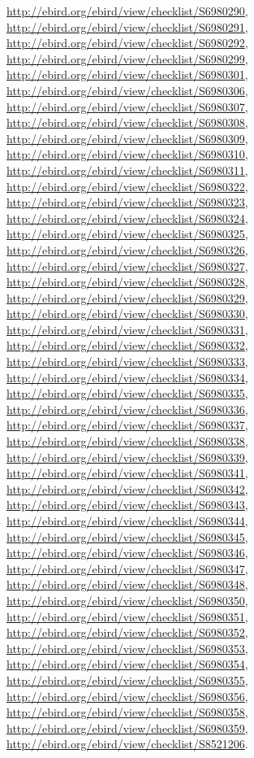 \documentclass[9pt, article]{memoir}
\begin{document}
\begin{multicols}{2}
\url{http://ebird.org/ebird/view/checklist/S6980290}, 
\url{http://ebird.org/ebird/view/checklist/S6980291}, 
\url{http://ebird.org/ebird/view/checklist/S6980292}, 
\url{http://ebird.org/ebird/view/checklist/S6980299}, 
\url{http://ebird.org/ebird/view/checklist/S6980301}, 
\url{http://ebird.org/ebird/view/checklist/S6980306}, 
\url{http://ebird.org/ebird/view/checklist/S6980307}, 
\url{http://ebird.org/ebird/view/checklist/S6980308}, 
\url{http://ebird.org/ebird/view/checklist/S6980309}, 
\url{http://ebird.org/ebird/view/checklist/S6980310}, 
\url{http://ebird.org/ebird/view/checklist/S6980311}, 
\url{http://ebird.org/ebird/view/checklist/S6980322}, 
\url{http://ebird.org/ebird/view/checklist/S6980323}, 
\url{http://ebird.org/ebird/view/checklist/S6980324}, 
\url{http://ebird.org/ebird/view/checklist/S6980325}, 
\url{http://ebird.org/ebird/view/checklist/S6980326}, 
\url{http://ebird.org/ebird/view/checklist/S6980327}, 
\url{http://ebird.org/ebird/view/checklist/S6980328}, 
\url{http://ebird.org/ebird/view/checklist/S6980329}, 
\url{http://ebird.org/ebird/view/checklist/S6980330}, 
\url{http://ebird.org/ebird/view/checklist/S6980331}, 
\url{http://ebird.org/ebird/view/checklist/S6980332}, 
\url{http://ebird.org/ebird/view/checklist/S6980333}, 
\url{http://ebird.org/ebird/view/checklist/S6980334}, 
\url{http://ebird.org/ebird/view/checklist/S6980335}, 
\url{http://ebird.org/ebird/view/checklist/S6980336}, 
\url{http://ebird.org/ebird/view/checklist/S6980337}, 
\url{http://ebird.org/ebird/view/checklist/S6980338}, 
\url{http://ebird.org/ebird/view/checklist/S6980339}, 
\url{http://ebird.org/ebird/view/checklist/S6980341}, 
\url{http://ebird.org/ebird/view/checklist/S6980342}, 
\url{http://ebird.org/ebird/view/checklist/S6980343}, 
\url{http://ebird.org/ebird/view/checklist/S6980344}, 
\url{http://ebird.org/ebird/view/checklist/S6980345}, 
\url{http://ebird.org/ebird/view/checklist/S6980346}, 
\url{http://ebird.org/ebird/view/checklist/S6980347}, 
\url{http://ebird.org/ebird/view/checklist/S6980348}, 
\url{http://ebird.org/ebird/view/checklist/S6980350}, 
\url{http://ebird.org/ebird/view/checklist/S6980351}, 
\url{http://ebird.org/ebird/view/checklist/S6980352}, 
\url{http://ebird.org/ebird/view/checklist/S6980353}, 
\url{http://ebird.org/ebird/view/checklist/S6980354}, 
\url{http://ebird.org/ebird/view/checklist/S6980355}, 
\url{http://ebird.org/ebird/view/checklist/S6980356}, 
\url{http://ebird.org/ebird/view/checklist/S6980358}, 
\url{http://ebird.org/ebird/view/checklist/S6980359}, 
\url{http://ebird.org/ebird/view/checklist/S8521206}.


\end{multicols}
\end{document}
